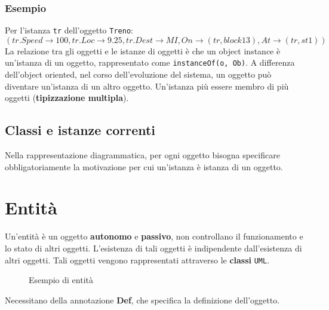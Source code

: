 \subsubsection{Esempio}
Per l'istanza \texttt{tr} dell'oggetto \texttt{Treno}:
\[
(tr.Speed \rightarrow 100, tr.Loc \rightarrow 9.25, tr.Dest \rightarrow MI,
On \rightarrow (tr, block13), At \rightarrow (tr, st1))
\]
La relazione tra gli oggetti e le istanze di oggetti è che 
un object instance è un'istanza di un oggetto, rappresentato come \texttt{instanceOf(o, Ob)}.
A differenza dell'object oriented, nel corso dell'evoluzione del sistema, un oggetto 
può diventare un'istanza di un altro oggetto. Un'istanza più essere membro di più 
oggetti (\textbf{tipizzazione multipla}).

\subsection{Classi e istanze correnti}
Nella rappresentazione diagrammatica, per ogni oggetto bisogna specificare obbligatoriamente 
la motivazione per cui un'istanza è istanza di un oggetto. 
\section{Entità}
\begin{tcolorbox}[colback=green!5!white,colframe=green!75!black, title=Entità]
    Un'entità è un oggetto \textbf{autonomo} e \textbf{passivo}, non controllano il funzionamento 
    e lo stato di altri oggetti. L'esistenza di tali oggetti è indipendente dall'esistenza di 
    altri oggetti. Tali oggetti vengono rappresentati attraverso le \textbf{classi} \texttt{UML}.
\end{tcolorbox}
\begin{figure}[H]
    \centering
    \caption{Esempio di entità}
\end{figure}
Necessitano della annotazione \textbf{Def}, che specifica la definizione dell'oggetto.
